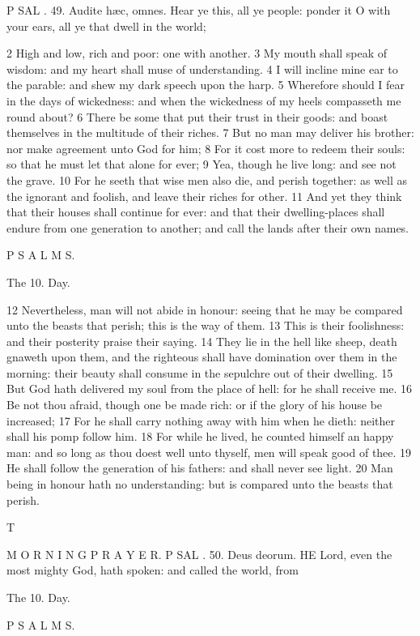 P SAL . 49. Audite hæc, omnes. Hear ye this, all ye people: ponder it O with your ears, all ye that dwell in the world;

2 High and low, rich and poor: one with another. 3 My mouth shall speak of wisdom: and my heart shall muse of understanding. 4 I will incline mine ear to the parable: and shew my dark speech upon the harp. 5 Wherefore should I fear in the days of wickedness: and when the wickedness of my heels compasseth me round about? 6 There be some that put their trust in their goods: and boast themselves in the multitude of their riches. 7 But no man may deliver his brother: nor make agreement unto God for him; 8 For it cost more to redeem their souls: so that he must let that alone for ever; 9 Yea, though he live long: and see not the grave. 10 For he seeth that wise men also die, and perish together: as well as the ignorant and foolish, and leave their riches for other. 11 And yet they think that their houses shall continue for ever: and that their dwelling-places shall endure from one generation to another; and call the lands after their own names.

P S A L M S.

The 10. Day.

12 Nevertheless, man will not abide in honour: seeing that he may be compared unto the beasts that perish; this is the way of them. 13 This is their foolishness: and their posterity praise their saying. 14 They lie in the hell like sheep, death gnaweth upon them, and the righteous shall have domination over them in the morning: their beauty shall consume in the sepulchre out of their dwelling. 15 But God hath delivered my soul from the place of hell: for he shall receive me. 16 Be not thou afraid, though one be made rich: or if the glory of his house be increased; 17 For he shall carry nothing away with him when he dieth: neither shall his pomp follow him. 18 For while he lived, he counted himself an happy man: and so long as thou doest well unto thyself, men will speak good of thee. 19 He shall follow the generation of his fathers: and shall never see light. 20 Man being in honour hath no understanding: but is compared unto the beasts that perish.

T

M O R N I N G P R A Y E R. P SAL . 50. Deus deorum. HE Lord, even the most mighty God, hath spoken: and called the world, from

The 10. Day.

P S A L M S.

